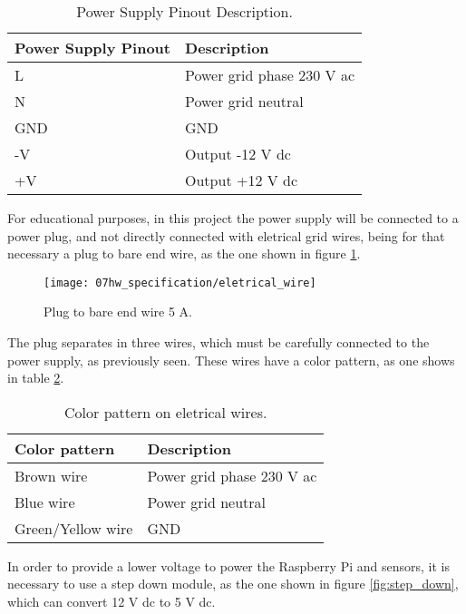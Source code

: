 \begin{table}[H]
	\centering
	\begin{tabular}{|m{5cm}|m{6cm}|}
		\hline
		\textbf{Power Supply Pinout} & \textbf{Description}
		\\\hline\hline
		 
		L & Power grid phase 230 V \ac{ac}
		\\\hline
		N & Power grid neutral
		\\\hline
		GND & GND
		\\\hline
		-V & Output -12 V \ac{dc}
		\\\hline
		+V & Output +12 V \ac{dc}
		\\\hline
	\end{tabular}
	\caption{Power Supply Pinout Description.}
	\label{table:power_supply_pinout}
\end{table}

For educational purposes, in this project the power supply will be connected to a power plug, and not directly connected with eletrical grid wires, being for that necessary a plug to bare end wire, as the one shown in figure \ref{fig:eletrical_wire}.

\begin{figure}[H]
	\centering
	\texttt{[image: 07hw\_specification/eletrical\_wire]}
	\caption{Plug to bare end wire 5 A.}
	\label{fig:eletrical_wire}
\end{figure}

The plug separates in three wires, which must be carefully connected to the power supply, as previously seen. These wires have a color pattern, as one shows in table \ref{table:color_pattern_wire}.

\begin{table}[H]
	\centering
	\begin{tabular}{|m{5cm}|m{6cm}|}
		\hline
		\textbf{Color pattern} & \textbf{Description}
		\\\hline\hline
		
		Brown wire & Power grid phase 230 V \ac{ac}
		\\\hline
		Blue wire & Power grid neutral
		\\\hline
		Green/Yellow wire & GND
		\\\hline
	\end{tabular}
	\caption{Color pattern on eletrical wires.}
	\label{table:color_pattern_wire}
\end{table}

In order to provide a lower voltage to power the Raspberry Pi and sensors, it is necessary to use a step down module, as the one shown in figure \ref{fig:step_down}, which can convert 12 V \ac{dc} to 5 V \ac{dc}. \cite{step_down}
 
